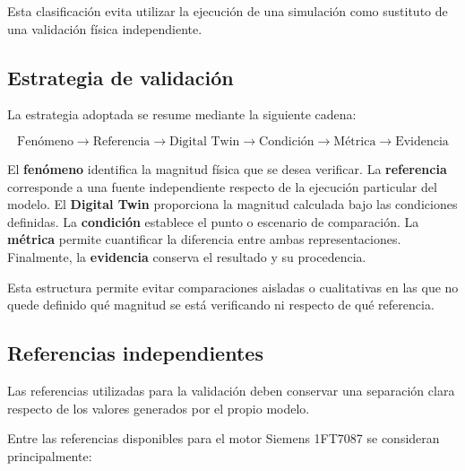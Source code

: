 Esta clasificación evita utilizar la ejecución de una simulación como sustituto de una validación física independiente.

\subsection{Estrategia de validación}

La estrategia adoptada se resume mediante la siguiente cadena:

\begin{equation}
\text{Fenómeno}
\rightarrow
\text{Referencia}
\rightarrow
\text{Digital Twin}
\rightarrow
\text{Condición}
\rightarrow
\text{Métrica}
\rightarrow
\text{Evidencia}
\end{equation}

El \textbf{fenómeno} identifica la magnitud física que se desea verificar. La \textbf{referencia} corresponde a una fuente independiente respecto de la ejecución particular del modelo. El \textbf{Digital Twin} proporciona la magnitud calculada bajo las condiciones definidas. La \textbf{condición} establece el punto o escenario de comparación. La \textbf{métrica} permite cuantificar la diferencia entre ambas representaciones. Finalmente, la \textbf{evidencia} conserva el resultado y su procedencia.

Esta estructura permite evitar comparaciones aisladas o cualitativas en las que no quede definido qué magnitud se está verificando ni respecto de qué referencia.

\subsection{Referencias independientes}

Las referencias utilizadas para la validación deben conservar una separación clara respecto de los valores generados por el propio modelo.

Entre las referencias disponibles para el motor Siemens 1FT7087 se consideran principalmente:

